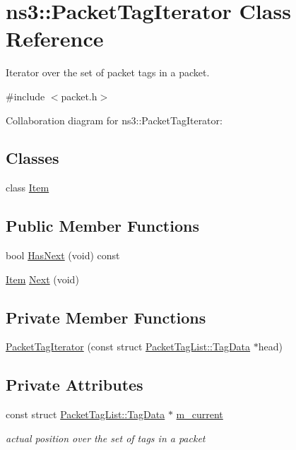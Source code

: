 \hypertarget{classns3_1_1PacketTagIterator}{}\section{ns3\+:\+:Packet\+Tag\+Iterator Class Reference}
\label{classns3_1_1PacketTagIterator}


Iterator over the set of packet tags in a packet.  




{\ttfamily \#include $<$packet.\+h$>$}



Collaboration diagram for ns3\+:\+:Packet\+Tag\+Iterator\+:
\subsection*{Classes}
\begin{DoxyCompactItemize}
\item 
class \hyperlink{classns3_1_1PacketTagIterator_1_1Item}{Item}
\end{DoxyCompactItemize}
\subsection*{Public Member Functions}
\begin{DoxyCompactItemize}
\item 
bool \hyperlink{classns3_1_1PacketTagIterator_a242c5fb08749ee8debc0c1aee2523f00}{Has\+Next} (void) const 
\item 
\hyperlink{classns3_1_1PacketTagIterator_1_1Item}{Item} \hyperlink{classns3_1_1PacketTagIterator_a0bd06e173562fe9702931ae652dcfb43}{Next} (void)
\end{DoxyCompactItemize}
\subsection*{Private Member Functions}
\begin{DoxyCompactItemize}
\item 
\hyperlink{classns3_1_1PacketTagIterator_a4199af2565052ec8625fcad1d90ccc6d}{Packet\+Tag\+Iterator} (const struct \hyperlink{structns3_1_1PacketTagList_1_1TagData}{Packet\+Tag\+List\+::\+Tag\+Data} $\ast$head)
\end{DoxyCompactItemize}
\subsection*{Private Attributes}
\begin{DoxyCompactItemize}
\item 
const struct \hyperlink{structns3_1_1PacketTagList_1_1TagData}{Packet\+Tag\+List\+::\+Tag\+Data} $\ast$ \hyperlink{classns3_1_1PacketTagIterator_a187ae0b5be2c015084b119d9d1080716}{m\+\_\+current}
\begin{DoxyCompactList}\small\item\em actual position over the set of tags in a packet \end{DoxyCompactList}\end{DoxyCompactItemize}
